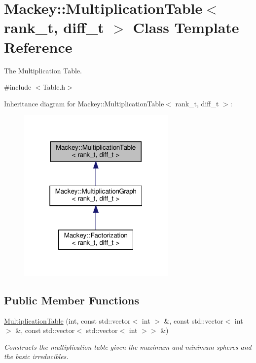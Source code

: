 \hypertarget{classMackey_1_1MultiplicationTable}{}\section{Mackey\+:\+:Multiplication\+Table$<$ rank\+\_\+t, diff\+\_\+t $>$ Class Template Reference}
\label{classMackey_1_1MultiplicationTable}


The Multiplication Table.  




{\ttfamily \#include $<$Table.\+h$>$}



Inheritance diagram for Mackey\+:\+:Multiplication\+Table$<$ rank\+\_\+t, diff\+\_\+t $>$\+:\nopagebreak
\begin{figure}[H]
\begin{center}
\leavevmode
\includegraphics[width=220pt]{classMackey_1_1MultiplicationTable__inherit__graph}
\end{center}
\end{figure}
\subsection*{Public Member Functions}
\begin{DoxyCompactItemize}
\item 
\hyperlink{classMackey_1_1MultiplicationTable_a8530e27d8d2c3c755eb5041a2ee8c35b}{Multiplication\+Table} (int, const std\+::vector$<$ int $>$ \&, const std\+::vector$<$ int $>$ \&, const std\+::vector$<$ std\+::vector$<$ int $>$$>$ \&)
\begin{DoxyCompactList}\small\item\em Constructs the multiplication table given the maximum and minimum spheres and the basic irreducibles. \end{DoxyCompactList}\end{DoxyCompactItemize}
